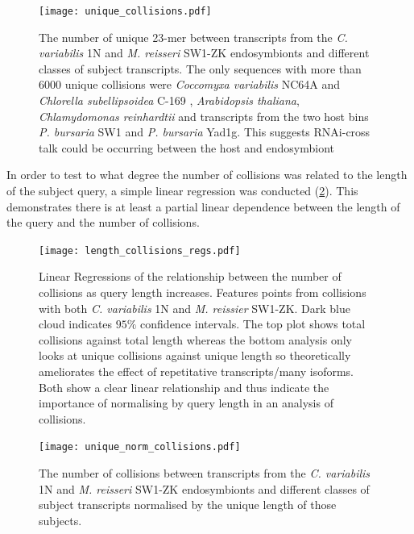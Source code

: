 \begin{figure}
    \texttt{[image: unique\_collisions.pdf]}
    \caption[Unique eDicer Collisions by Subject Class]{The number of unique 23-mer
        between transcripts from the \textit{C. variabilis} 1N
    and \textit{M. reisseri} SW1-ZK endosymbionts and different
classes of subject transcripts.  The only sequences with more than 6000
unique collisions were \textit{Coccomyxa variabilis} NC64A and \textit{Chlorella subellipsoidea} C-169
, \textit{Arabidopsis thaliana}, \textit{Chlamydomonas reinhardtii} and transcripts
from the two host bins \textit{P. bursaria} SW1 and \textit{P. bursaria} Yad1g.  
This suggests RNAi-cross talk could be occurring between the host and endosymbiont}
\label{fig:unique_collisions}
\end{figure}

In order to test to what degree the number of collisions was related
to the length of the subject query, a simple linear regression
was conducted (\cref{fig:edicer_collisions_by_length}).  
This demonstrates there is at least a partial linear dependence between the 
length of the query and the number of collisions.

\begin{figure}
    \centering
    \texttt{[image: length\_collisions\_regs.pdf]}
    \caption[Regression of eDicer Collisions by Query Length]{Linear Regressions
    of the relationship between the number of collisions as query length
increases. Features points from collisions with both \textit{C. variabilis} 1N
and \textit{M. reissier} SW1-ZK.  Dark blue cloud indicates \(95\%\) confidence
intervals.  
The top plot shows total collisions against
total length whereas the bottom analysis only looks at unique collisions
against unique length so theoretically ameliorates the effect of repetitative 
transcripts/many isoforms.  Both show a clear linear relationship and thus
indicate the importance of normalising by query length in an analysis of 
collisions.}
    \label{fig:edicer_collisions_by_length}
\end{figure}

\begin{figure}
    \centering
    \texttt{[image: unique\_norm\_collisions.pdf]}
    \caption[Normalised Unique eDicer Collisions]{The number of collisions
        between transcripts from the \textit{C. variabilis} 1N
    and \textit{M. reisseri} SW1-ZK endosymbionts and different
classes of subject transcripts normalised by the unique length of those
subjects.}
    \label{fig:edicer_unique_norm}
\end{figure}

